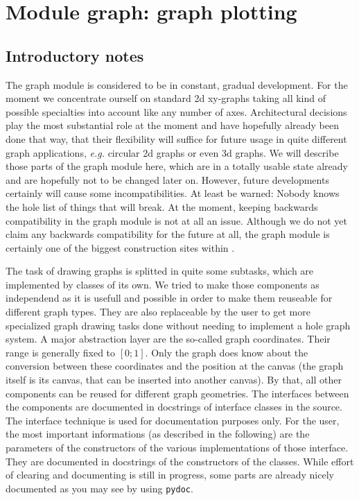 \chapter{Module graph: graph plotting}
\label{graph}
\section{Introductory notes}

The graph module is considered to be in constant, gradual development.
For the moment we concentrate ourself on standard 2d xy-graphs taking
all kind of possible specialties into account like any number of axes.
Architectural decisions play the most substantial role at the moment
and have hopefully already been done that way, that their flexibility
will suffice for future usage in quite different graph applications,
\emph{e.g.} circular 2d graphs or even 3d graphs. We will describe
those parts of the graph module here, which are in a totally usable
state already and are hopefully not to be changed later on. However,
future developments certainly will cause some incompatibilities. At
least be warned: Nobody knows the hole list of things that will break.
At the moment, keeping backwards compatibility in the graph module is
not at all an issue. Although we do not yet claim any backwards
compatibility for the future at all, the graph module is certainly one
of the biggest construction sites within \PyX.

The task of drawing graphs is splitted in quite some subtasks, which
are implemented by classes of its own. We tried to make those
components as independend as it is usefull and possible in order to
make them reuseable for different graph types. They are also
replaceable by the user to get more specialized graph drawing tasks
done without needing to implement a hole graph system. A major
abstraction layer are the so-called graph coordinates. Their range is
generally fixed to $[0;1]$. Only the graph does know about the
conversion between these coordinates and the position at the canvas
(the graph itself is its canvas, that can be inserted into another
canvas). By that, all other components can be reused for different
graph geometries. The interfaces between the components are documented
in docstrings of interface classes in the source. The interface
technique is used for documentation purposes only. For the user, the
most important informations (as described in the following) are the
parameters of the constructors of the various implementations of those
interface. They are documented in docstrings of the constructors of
the classes. While effort of clearing and documenting is still in
progress, some parts are already nicely documented as you may see by
using \verb|pydoc|.

